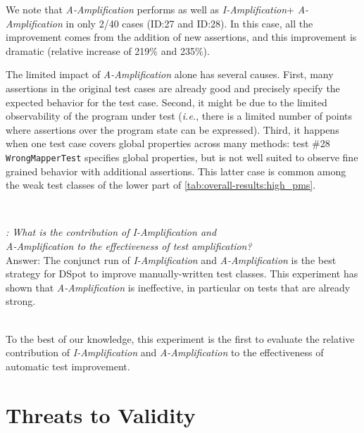 \documentclass[table,xcdraw,smallextended]{svjour3}
\newcommand{\Iampl}{\emph{I-Amplification}\xspace}
\newcommand{\Aampl}{\emph{A-Amplification}\xspace}
\newcommand{\ie}{\textit{i.e.}\xspace}
\newcommand{\dspot}{DSpot\xspace}
\begin{document}
We note that \Aampl{} performs as well as \Iampl + \Aampl in only 2/40 cases (ID:27 and ID:28). In this case, all the improvement comes from the addition of new assertions, and this improvement is dramatic (relative increase of 219\% and 235\%).

The limited impact of \Aampl alone has several causes. First, many assertions in the original test cases are already good and precisely specify the expected behavior for the test case.
Second, it might be due to the limited observability of the program under test (\ie, there is a limited number of points where assertions over the program state can be expressed).
Third, it happens when one test case covers global properties across many methods: test \#28 \texttt{WrongMapperTest} specifies global properties, but is not well suited to observe fine grained behavior with additional assertions. This latter case is common among the weak test classes of the lower part of \autoref{tab:overall-results:high_pms}.


~\\

\begin{mdframed}
\textit{\rqAmplVersusIAmpl: What is the contribution of \Iampl{} and \\\Aampl{} to the effectiveness of test amplification?}\\
Answer: The conjunct run of \Iampl{} and \Aampl{} is the best strategy for \dspot{} to improve manually-written test classes. This experiment has shown that \Aampl{} is ineffective, in particular on tests that are already strong.
\end{mdframed}
~\\

To the best of our knowledge, this experiment is the first to evaluate the relative contribution of \Iampl and \Aampl to the effectiveness of automatic test improvement.

\section{Threats to Validity}
\label{sec:threats}
\end{document}

